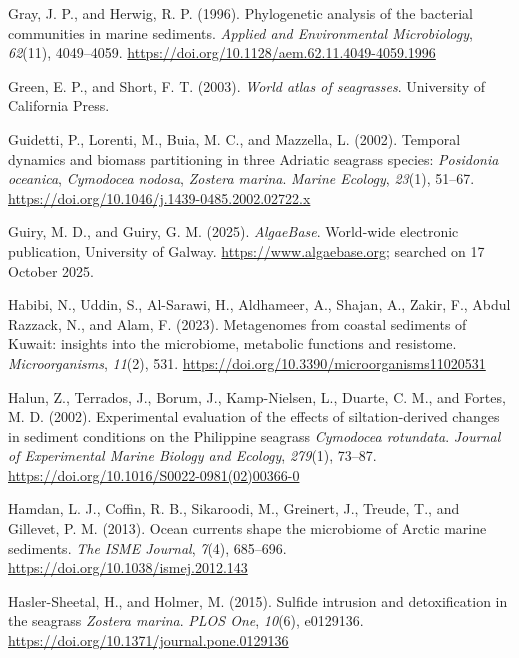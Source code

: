 \documentclass[
  12 pt,
]{book}
\newlength{\cslhangindent}
\newlength{\cslentryspacingunit} %
\newenvironment{CSLReferences}[2] %
 {%
  \setlength{\parindent}{0pt}
  \ifodd #1
  \let\oldpar\par
  \def\par{\hangindent=\cslhangindent\oldpar}
  \fi
  \setlength{\parskip}{#2\cslentryspacingunit}
 }%
 {}
\begin{document}
\begin{CSLReferences}{1}{0}
\leavevmode{}%
Gray, J. P., and Herwig, R. P. (1996). Phylogenetic analysis of the bacterial communities in marine sediments. \emph{Applied and Environmental Microbiology}, \emph{62}(11), 4049--4059. \url{https://doi.org/10.1128/aem.62.11.4049-4059.1996}

\leavevmode{}%
Green, E. P., and Short, F. T. (2003). \emph{World atlas of seagrasses}. University of California Press.

\leavevmode{}%
Guidetti, P., Lorenti, M., Buia, M. C., and Mazzella, L. (2002). Temporal dynamics and biomass partitioning in three {Adriatic} seagrass species: {{{\emph{Posidonia oceanica}}}, {{\emph{Cymodocea nodosa}}}, {{\emph{Zostera marina}}}}. \emph{Marine Ecology}, \emph{23}(1), 51--67. \url{https://doi.org/10.1046/j.1439-0485.2002.02722.x}

\leavevmode{}%
Guiry, M. D., and Guiry, G. M. (2025). \emph{{AlgaeBase}}. World-wide electronic publication, University of Galway. \url{https://www.algaebase.org}; searched on 17 October 2025.

\leavevmode{}%
Habibi, N., Uddin, S., Al-Sarawi, H., Aldhameer, A., Shajan, A., Zakir, F., Abdul Razzack, N., and Alam, F. (2023). Metagenomes from coastal sediments of {Kuwait}: insights into the microbiome, metabolic functions and resistome. \emph{Microorganisms}, \emph{11}(2), 531. \url{https://doi.org/10.3390/microorganisms11020531}

\leavevmode{}%
Halun, Z., Terrados, J., Borum, J., Kamp-Nielsen, L., Duarte, C. M., and Fortes, M. D. (2002). Experimental evaluation of the effects of siltation-derived changes in sediment conditions on the {Philippine} seagrass {{\emph{Cymodocea rotundata}}}. \emph{Journal of Experimental Marine Biology and Ecology}, \emph{279}(1), 73--87. \url{https://doi.org/10.1016/S0022-0981(02)00366-0}

\leavevmode{}%
Hamdan, L. J., Coffin, R. B., Sikaroodi, M., Greinert, J., Treude, T., and Gillevet, P. M. (2013). Ocean currents shape the microbiome of {Arctic} marine sediments. \emph{The ISME Journal}, \emph{7}(4), 685--696. \url{https://doi.org/10.1038/ismej.2012.143}

\leavevmode{}%
Hasler-Sheetal, H., and Holmer, M. (2015). Sulfide intrusion and detoxification in the seagrass {{\emph{Zostera marina}}}. \emph{PLOS One}, \emph{10}(6), e0129136. \url{https://doi.org/10.1371/journal.pone.0129136}


\end{CSLReferences}
\end{document}
